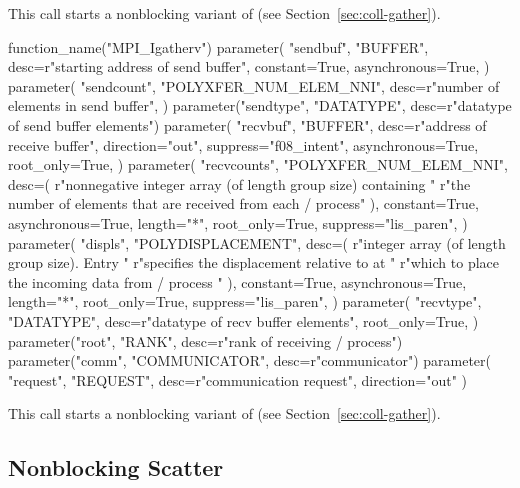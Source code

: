 This call starts a nonblocking variant of  (see
Section~\ref{sec:coll-gather}).

\begin{mpi-binding}
    function_name("MPI_Igatherv")
    parameter(
        "sendbuf",
        "BUFFER",
        desc=r"starting address of send buffer",
        constant=True,
        asynchronous=True,
    )
    parameter(
        "sendcount",
        "POLYXFER_NUM_ELEM_NNI",
        desc=r"number of elements in send buffer",
    )
    parameter("sendtype", "DATATYPE", desc=r"datatype of send buffer elements")
    parameter(
        "recvbuf",
        "BUFFER",
        desc=r"address of receive buffer",
        direction="out",
        suppress="f08_intent",
        asynchronous=True,
        root_only=True,
    )
    parameter(
        "recvcounts",
        "POLYXFER_NUM_ELEM_NNI",
        desc=(
            r"nonnegative integer array (of length group size) containing "
            r"the number of elements that are received from each \MPI/ process"
        ),
        constant=True,
        asynchronous=True,
        length="*",
        root_only=True,
        suppress="lis_paren",
    )
    parameter(
        "displs",
        "POLYDISPLACEMENT",
        desc=(
            r"integer array (of length group size). Entry  "
            r"specifies the displacement relative to  at "
            r"which to place the incoming data from \MPI/ process "
        ),
        constant=True,
        asynchronous=True,
        length="*",
        root_only=True,
        suppress="lis_paren",
    )
    parameter(
        "recvtype",
        "DATATYPE",
        desc=r"datatype of recv buffer elements",
        root_only=True,
    )
    parameter("root", "RANK", desc=r"rank of receiving \MPI/ process")
    parameter("comm", "COMMUNICATOR", desc=r"communicator")
    parameter(
        "request", "REQUEST", desc=r"communication request", direction="out"
    )
\end{mpi-binding}

This call starts a nonblocking variant of  (see
Section~\ref{sec:coll-gather}).

\subsection{Nonblocking Scatter}
\label{sec:nbcoll-iscatter}

